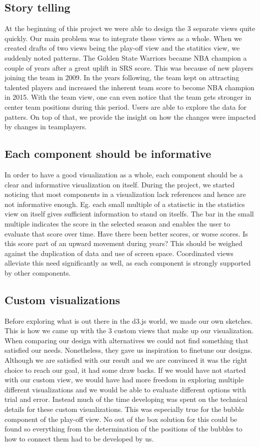 \documentclass[chi_draft]{sigchi}
\begin{document}
\subsection{Story telling}
At the beginning of this project we were able to design the 3 separate views
quite quickly. Our main problem was to integrate these views as a whole. When we
created drafts of two views being the play-off view and the statitics view, we
suddenly noted patterns. The Golden State Warriors became NBA champion a couple
of years after a great uplift in SRS score. This was because of new players
joining the team in 2009. In the years following, the team kept on attracting
talented players and increased the inherent team score to become NBA champion in
2015. With the team view, one can even notice that the team gets stronger in
center team positions during this period. Users are able to explore the data for
patters. On top of that, we provide the insight on how the changes were impacted
by changes in teamplayers.

\subsection{Each component should be informative}
In order to have a good visualization as a whole, each component should be a
clear and informative visualization on itself. During the project, we started noticing that most components in a visualization lack references and hence are not informative enough. Eg. each small multiple of a statisctic in the statistics view on itself gives sufficient information to stand on itselfs. The bar in the small multiple indicates the score in the selected season and enables the user to evaluate that score over time. Have there been better scores, or worse scores. Is this score
part of an upward movement during years? This should be weighed against the
duplication of data and use of screen space. Coordinated views alleviate this
need significantly as well, as each component is strongly supported by other
components.

\subsection{Custom visualizations}
Before exploring what is out there in the d3.js world, we made our own sketches.
This is how we came up with the 3 custom views that make up our visualization.
When comparing our design with alternatives we could not find something that
satisfied our needs. Nonetheless, they gave us inspiration to finetune our
designs. Although we are satisfied with our result and we are convinced it was
the right choice to reach our goal, it had some draw backs. If we would have not started with our custom view, we would have had more freedom in exploring multiple different visualizations and we would be able to evaluate different options with trial and error. Instead much of the time developing was spent on the technical details for these custom visualizations. This was especially true for the bubble component of the play-off view. No out of the box solution for this could be found so everything from the determination of the positions of the bubbles to how to connect them had to be developed by us.
\end{document}
